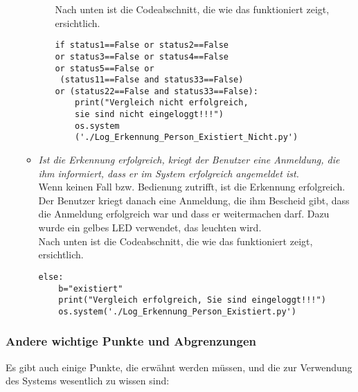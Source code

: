 \begin{enumerate}
\begin{itemize}
\begin{enumerate}
		Nach unten ist die Codeabschnitt, die wie das funktioniert zeigt, ersichtlich.\\
	
\begin{lstlisting}
if status1==False or status2==False 
or status3==False or status4==False 
or status5==False or
 (status11==False and status33==False) 
or (status22==False and status33==False):
	print("Vergleich nicht erfolgreich, 
	sie sind nicht eingeloggt!!!")
	os.system
	('./Log_Erkennung_Person_Existiert_Nicht.py')
\end{lstlisting}
		
	\end{enumerate}
\item \textit{Ist die Erkennung erfolgreich, kriegt der Benutzer eine Anmeldung, die ihm informiert, dass er im System erfolgreich angemeldet ist.} \\

Wenn keinen Fall bzw. Bedienung zutrifft, ist die Erkennung erfolgreich. Der Benutzer kriegt danach eine Anmeldung, die ihm Bescheid gibt, dass die Anmeldung erfolgreich war und dass er weitermachen darf. Dazu wurde ein gelbes LED verwendet, das leuchten wird. \\

Nach unten ist die Codeabschnitt, die wie das funktioniert zeigt, ersichtlich.\\

\begin{lstlisting}
else:
	b="existiert"
	print("Vergleich erfolgreich, Sie sind eingeloggt!!!")
	os.system('./Log_Erkennung_Person_Existiert.py')
\end{lstlisting}

\end{itemize}
\end{enumerate}
\subsubsection{Andere wichtige Punkte und Abgrenzungen}

Es gibt auch einige Punkte, die erwähnt werden müssen, und die zur Verwendung des Systems wesentlich zu wissen sind:

